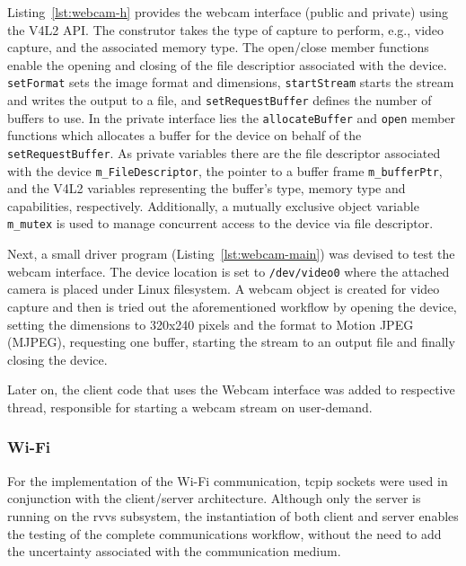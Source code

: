 Listing~\ref{lst:webcam-h} provides the webcam interface (public and private)
using the V4L2 API. The construtor takes the type of capture to perform, e.g.,
video capture, and the associated memory type. The open/close member functions
enable the opening and closing of the file descriptior associated with the
device. \texttt{setFormat} sets the image format and dimensions,
\texttt{startStream} starts the stream and writes the output to a file, and
\texttt{setRequestBuffer} defines the number of buffers to use. In the private
interface lies the \texttt{allocateBuffer} and \texttt{open} member functions which allocates a
buffer for the device on behalf of the \texttt{setRequestBuffer}. As private
variables there are the file descriptor associated with the device
\texttt{m\_FileDescriptor}, the pointer to a buffer frame \texttt{m\_bufferPtr},
and the V4L2 variables representing the buffer's type, memory type and
capabilities, respectively. Additionally, a mutually exclusive object variable
\texttt{m\_mutex} is used to manage concurrent access to the device via file descriptor.
%

Next, a small driver program (Listing~\ref{lst:webcam-main}) was devised to test
the webcam interface. The device location is set to \texttt{/dev/video0} where
the attached camera is placed under Linux filesystem. A webcam object is created
for video capture and then is tried out the aforementioned workflow by opening
the device, setting the dimensions to 320x240 pixels and the format to Motion
JPEG (MJPEG), requesting one buffer, starting the stream to an output file and
finally closing the device. 
%

Later on, the client code that uses the Webcam interface was added to
respective thread, responsible for starting a webcam stream on user-demand.
%
\subsubsection{Wi-Fi}%
\label{sec:wi-fi-rvvs-implem}
For the implementation of the Wi-Fi communication, \gls{tcpip} sockets were used
in conjunction with the client/server architecture. Although only the server is
running on the \gls{rvvs} subsystem, the instantiation of both client and server
enables the testing of the complete communications workflow, without the need to
add the uncertainty associated with the communication medium.

%
